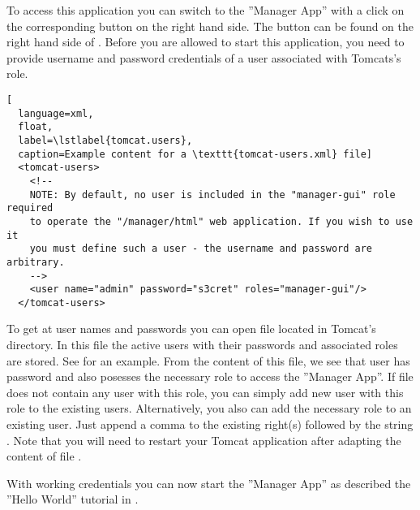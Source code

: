 \documentclass[a4paper,10pt,twoside]{book}
\begin{document}
To access this application you can switch to the ''Manager App'' with a click on the corresponding button on the right hand side.
The button can be found on the right hand side of .
Before you are allowed to start this application, you need to provide username and password credentials of a user associated with Tomcats's  role.

\begin{lstlisting}[
  language=xml,
  float,
  label=\lstlabel{tomcat.users},
  caption=Example content for a \texttt{tomcat-users.xml} file]
  <tomcat-users>
    <!--
    NOTE: By default, no user is included in the "manager-gui" role required
    to operate the "/manager/html" web application. If you wish to use it
    you must define such a user - the username and password are arbitrary.
    -->
	<user name="admin" password="s3cret" roles="manager-gui"/>
  </tomcat-users>	
\end{lstlisting}

To get at user names and passwords you can open file  located in Tomcat's  directory.
In this file the active users with their passwords and associated roles are stored.
See  for an example.
From the content of this file, we see that user  has password  and also posesses the necessary role  to access the ''Manager App''.
If file  does not contain any user with this role, you can simply add new user with this role to the existing users.
Alternatively, you also can add the necessary role to an existing user.
Just append a comma to the existing right(s) followed by the string .
Note that you will need to restart your Tomcat application after adapting the content of file .

With working credentials you can now start the ''Manager App'' as described the ''Hello World'' tutorial in .


\ifx\wholebook\relax\else
   
   
\end{document}
